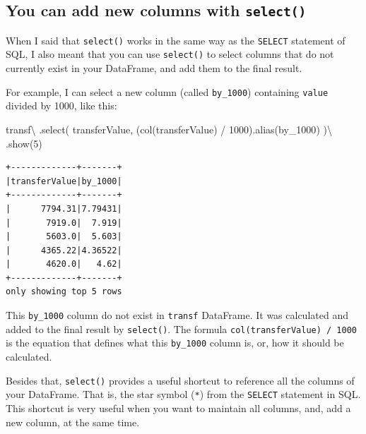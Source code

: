 \documentclass[
  11pt,
  letterpaper,
  DIV=11,
  numbers=noendperiod]{scrreprt}
\newenvironment{Shaded}{\begin{snugshade}}{\end{snugshade}}
\newcommand{\DecValTok}[1]{\textcolor[rgb]{0.68,0.00,0.00}{#1}}
\newcommand{\NormalTok}[1]{\textcolor[rgb]{0.00,0.23,0.31}{#1}}
\newcommand{\OperatorTok}[1]{\textcolor[rgb]{0.37,0.37,0.37}{#1}}
\newcommand{\StringTok}[1]{\textcolor[rgb]{0.13,0.47,0.30}{#1}}
\begin{document}
\subsection{\texorpdfstring{You can add new columns with
\texttt{select()}}{You can add new columns with select()}}\label{you-can-add-new-columns-with-select}

When I said that \texttt{select()} works in the same way as the
\texttt{SELECT} statement of SQL, I also meant that you can use
\texttt{select()} to select columns that do not currently exist in your
DataFrame, and add them to the final result.

For example, I can select a new column (called \texttt{by\_1000})
containing \texttt{value} divided by 1000, like this:

\begin{Shaded}
\begin{Highlighting}[]
\NormalTok{transf}\OperatorTok{\textbackslash{}}
\NormalTok{  .select(}
    \StringTok{\textquotesingle{}transferValue\textquotesingle{}}\NormalTok{,}
\NormalTok{    (col(}\StringTok{\textquotesingle{}transferValue\textquotesingle{}}\NormalTok{) }\OperatorTok{/} \DecValTok{1000}\NormalTok{).alias(}\StringTok{\textquotesingle{}by\_1000\textquotesingle{}}\NormalTok{)}
\NormalTok{  )}\OperatorTok{\textbackslash{}}
\NormalTok{  .show(}\DecValTok{5}\NormalTok{)}
\end{Highlighting}
\end{Shaded}

\begin{verbatim}
+-------------+-------+
|transferValue|by_1000|
+-------------+-------+
|      7794.31|7.79431|
|       7919.0|  7.919|
|       5603.0|  5.603|
|      4365.22|4.36522|
|       4620.0|   4.62|
+-------------+-------+
only showing top 5 rows
\end{verbatim}

This \texttt{by\_1000} column do not exist in \texttt{transf} DataFrame.
It was calculated and added to the final result by \texttt{select()}.
The formula
\texttt{col(\textquotesingle{}transferValue\textquotesingle{})\ /\ 1000}
is the equation that defines what this \texttt{by\_1000} column is, or,
how it should be calculated.

Besides that, \texttt{select()} provides a useful shortcut to reference
all the columns of your DataFrame. That is, the star symbol (\texttt{*})
from the \texttt{SELECT} statement in SQL. This shortcut is very useful
when you want to maintain all columns, and, add a new column, at the
same time.
\end{document}
